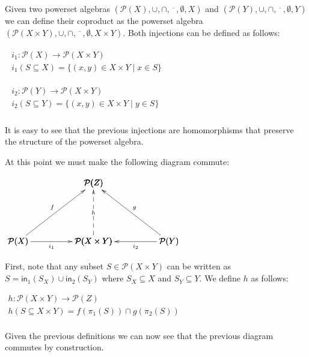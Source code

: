 \documentclass{article}
\newcommand{\powerset}[1]{\mathcal{P}(#1)}
\newcommand{\inO}[1]{\mathsf{in}_1(#1)}
\newcommand{\inT}[1]{\mathsf{in}_2(#1)}
\begin{document}
Given two powerset algebras $(\powerset{X},\cup,\cap,
\overline{\stackrel{\,\,\,\,}{\stackrel{\,\,\,\,}{\,\,\,\,}}},\emptyset,X)$
and
$(\powerset{Y},\cup,\cap,
\overline{\stackrel{\,\,\,\,}{\stackrel{\,\,\,\,}{\,\,\,\,}}},\emptyset,Y)$
we can define their coproduct as the powerset algebra
$(\powerset{X \times Y},\cup,\cap,
\overline{\stackrel{\,\,\,\,}{\stackrel{\,\,\,\,}{\,\,\,\,}}},\emptyset,X \times Y)$.
Both injections can be defined as follows:
\begin{center}
  \begin{math}
    \begin{array}{lll}
      \begin{array}{lll}
      i_1 : \powerset{X} \to \powerset{X \times Y}\\
      i_1(S \subseteq X) = \{(x,y) \in X \times Y \mid x \in S\}\\
      \end{array}\\
      \\
      \begin{array}{lll}
        i_2 : \powerset{Y} \to \powerset{X \times Y}\\
        i_2(S \subseteq Y) = \{(x,y) \in X \times Y \mid y \in S\}\\
    \end{array}
    \end{array}
  \end{math}
\end{center}
It is easy to see that the previous injections are homomorphisms that
preserve the structure of the powerset algebra.

At this point we must make the following diagram commute:
\begin{center}
  \begin{math}
    \bfig
    \Atrianglepair/<-`<--`<-`->`<-/<900,700>[\powerset{Z}`\powerset{X}`\powerset{X \times Y}`\powerset{Y};f`h`g`i_1`i_2]
    \efig
  \end{math}
\end{center}
First, note that any subset $S \in \powerset{X \times Y}$ can be written as
$S = \inO{S_X} \cup \inT{S_Y}$ where $S_X \subseteq X$ and $S_Y \subseteq Y$. We define $h$ as follows:
\begin{center}
  \begin{math}
    \begin{array}{lll}
      h : \powerset{X \times Y} \to \powerset{Z}\\
      h(S \subseteq X \times Y) = f(\pi_1(S)) \cap g(\pi_2(S))\\
    \end{array}
  \end{math}
\end{center}
Given the previous definitions we can now see that the previous diagram commutes by construction.
\end{document}
